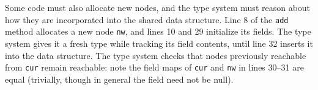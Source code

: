Some code must also allocate new nodes, and the type system must reason about how they are incorporated into the shared data structure.
Line 8 of the \texttt{add} method allocates a new node \texttt{nw}, and lines 10 and 29 initialize its fields.
The type system gives it a \textsf{fresh} type while tracking its field contents, until line 32 inserts it into the data structure.  The type system checks that nodes previously reachable from \lstinline|cur| remain reachable: note the field maps of \lstinline|cur| and \texttt{nw} in lines 30--31 are equal (trivially, though in general the field need not be  null).
